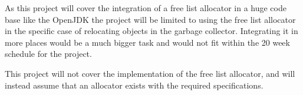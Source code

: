 

As this project will cover the integration of a free list allocator in a huge code base like the OpenJDK the project will be limited to using the free list allocator in the specific case of relocating objects in the garbage collector. Integrating it in more places would be a much bigger task and would not fit within the 20 week schedule for the project.

This project will not cover the implementation of the free list allocator, and will instead assume that an allocator exists with the required specifications. 
